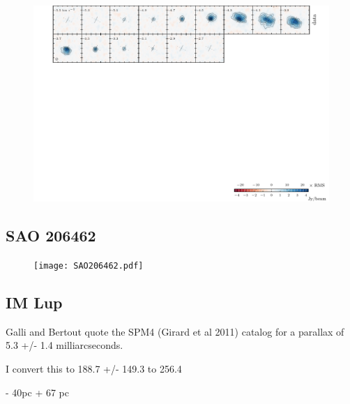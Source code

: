 \documentclass[twocolumn]{aastex6}
\begin{document}
\begin{figure}[htb]
\begin{center}
  \includegraphics{TWHya.pdf}
  \end{center}
\end{figure}

\subsection{SAO 206462}

\begin{figure}[htb]
\begin{center}
  \texttt{[image: SAO206462.pdf]}
  \end{center}
\end{figure}

\subsection{IM Lup}

Galli and Bertout quote the SPM4 (Girard et al 2011) catalog for a parallax of 5.3 +/- 1.4 milliarcseconds.

I convert this to 188.7 +/-
149.3 to 256.4

- 40pc + 67 pc
\end{document}
